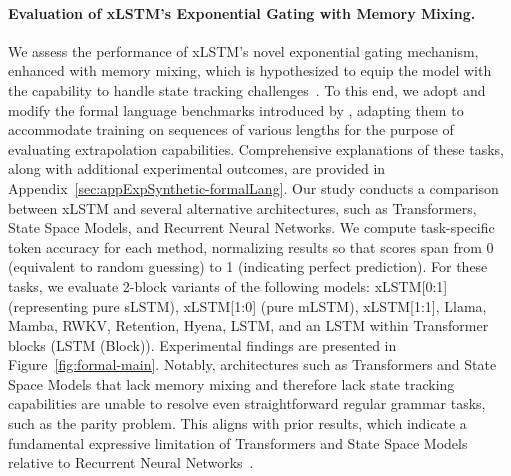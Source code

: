 \paragraph{Evaluation of xLSTM's Exponential Gating with Memory Mixing.} We assess the performance of xLSTM's novel exponential gating mechanism, enhanced with memory mixing, which is hypothesized to equip the model with the capability to handle state tracking challenges~\citep{Merrill:24, Merrill:23}. To this end, we adopt and modify the formal language benchmarks introduced by \citet{Deletang:23}, adapting them to accommodate training on sequences of various lengths for the purpose of evaluating extrapolation capabilities. Comprehensive explanations of these tasks, along with additional experimental outcomes, are provided in Appendix~\ref{sec:appExpSynthetic-formalLang}. Our study conducts a comparison between xLSTM and several alternative architectures, such as Transformers, State Space Models, and Recurrent Neural Networks. We compute task-specific token accuracy for each method, normalizing results so that scores span from 0 (equivalent to random guessing) to 1 (indicating perfect prediction). For these tasks, we evaluate 2-block variants of the following models: xLSTM[0:1] (representing pure sLSTM), xLSTM[1:0] (pure mLSTM), xLSTM[1:1], Llama, Mamba, RWKV, Retention, Hyena, LSTM, and an LSTM within Transformer blocks (LSTM (Block)). Experimental findings are presented in Figure~\ref{fig:formal-main}. Notably, architectures such as Transformers and State Space Models that lack memory mixing and therefore lack state tracking capabilities are unable to resolve even straightforward regular grammar tasks, such as the parity problem. This aligns with prior results, which indicate a fundamental expressive limitation of Transformers and State Space Models relative to Recurrent Neural Networks~\citep{Merrill:24, Merrill:23, Deletang:23}.

